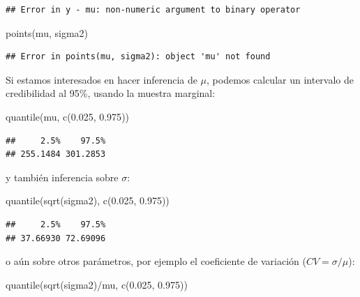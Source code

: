 \documentclass[
  12pt,
]{book}
\newenvironment{Shaded}{\begin{snugshade}}{\end{snugshade}}
\newcommand{\FloatTok}[1]{\textcolor[rgb]{0.00,0.00,0.81}{#1}}
\newcommand{\FunctionTok}[1]{\textcolor[rgb]{0.00,0.00,0.00}{#1}}
\newcommand{\NormalTok}[1]{#1}
\newcommand{\SpecialCharTok}[1]{\textcolor[rgb]{0.00,0.00,0.00}{#1}}
\theoremstyle{definition}
\theoremstyle{definition}
\theoremstyle{definition}
\theoremstyle{definition}
\theoremstyle{remark}
\begin{document}
\begin{verbatim}
## Error in y - mu: non-numeric argument to binary operator
\end{verbatim}

\begin{Shaded}
\begin{Highlighting}[]
\FunctionTok{points}\NormalTok{(mu, sigma2)}
\end{Highlighting}
\end{Shaded}

\begin{verbatim}
## Error in points(mu, sigma2): object 'mu' not found
\end{verbatim}

Si estamos interesados en hacer inferencia de \(\mu\), podemos calcular un intervalo de credibilidad al 95\%, usando la muestra marginal:

\begin{Shaded}
\begin{Highlighting}[]
\FunctionTok{quantile}\NormalTok{(mu, }\FunctionTok{c}\NormalTok{(}\FloatTok{0.025}\NormalTok{, }\FloatTok{0.975}\NormalTok{))}
\end{Highlighting}
\end{Shaded}

\begin{verbatim}
##     2.5%    97.5% 
## 255.1484 301.2853
\end{verbatim}

y también inferencia sobre \(\sigma\):

\begin{Shaded}
\begin{Highlighting}[]
\FunctionTok{quantile}\NormalTok{(}\FunctionTok{sqrt}\NormalTok{(sigma2), }\FunctionTok{c}\NormalTok{(}\FloatTok{0.025}\NormalTok{, }\FloatTok{0.975}\NormalTok{))}
\end{Highlighting}
\end{Shaded}

\begin{verbatim}
##     2.5%    97.5% 
## 37.66930 72.69096
\end{verbatim}

o aún sobre otros parámetros, por ejemplo el coeficiente de variación (\(CV=\sigma/\mu\)):

\begin{Shaded}
\begin{Highlighting}[]
\FunctionTok{quantile}\NormalTok{(}\FunctionTok{sqrt}\NormalTok{(sigma2)}\SpecialCharTok{/}\NormalTok{mu, }\FunctionTok{c}\NormalTok{(}\FloatTok{0.025}\NormalTok{, }\FloatTok{0.975}\NormalTok{))}
\end{Highlighting}
\end{Shaded}
\end{document}
